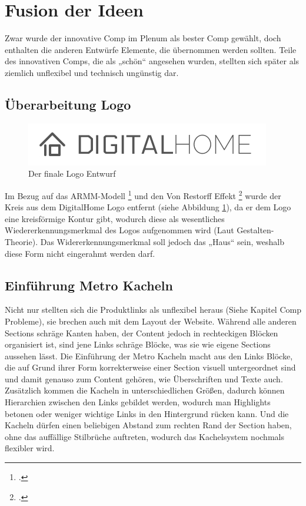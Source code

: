 \section{Fusion der Ideen}
Zwar wurde der innovative Comp im Plenum als bester Comp gewählt, doch enthalten die anderen Entwürfe Elemente, die übernommen werden sollten. Teile des innovativen Comps, die als „schön“ angesehen wurden, stellten sich später als ziemlich unflexibel und technisch ungünstig dar.
\subsection{Überarbeitung Logo}
\begin{figure} [tp]
\includegraphics[width=\textwidth]{./img/logo3.png}
\caption{Der finale Logo Entwurf}
\label{logo3}
\end{figure}
Im Bezug auf das ARMM-Modell \footcite[vgl.][]{ARMM:model} und den Von Restorff Effekt  \footcite[vgl.][]{ARMM:memory} wurde der Kreis aus dem DigitalHome Logo entfernt (siehe Abbildung \ref{logo3}), da er dem Logo eine kreisförmige Kontur gibt, wodurch diese als wesentliches Wiedererkennungsmerkmal des Logos aufgenommen wird (Laut Gestalten-Theorie). Das Widererkennungsmerkmal soll jedoch das „Haus“ sein, weshalb diese Form nicht eingerahmt werden darf.

\subsection{Einführung Metro Kacheln}
Nicht nur stellten sich die Produktlinks als unflexibel heraus (Siehe Kapitel Comp Probleme), sie brechen auch mit dem Layout der Website. Während alle anderen Sections schräge Kanten haben, der Content jedoch in rechteckigen Blöcken organisiert ist, sind jene Links schräge Blöcke, was sie wie eigene Sections aussehen lässt. Die Einführung der Metro Kacheln macht aus den Links Blöcke, die auf Grund ihrer Form korrekterweise einer Section visuell untergeordnet sind und damit genauso zum Content gehören, wie Überschriften und Texte auch. Zusätzlich kommen die Kacheln in unterschiedlichen Größen, dadurch können Hierarchien zwischen den Links gebildet werden, wodurch man Highlights betonen oder weniger wichtige Links in den Hintergrund rücken kann. Und die Kacheln dürfen einen beliebigen Abstand zum rechten Rand der Section haben, ohne das auffällige Stilbrüche auftreten, wodurch das Kachelsystem nochmals flexibler wird.
